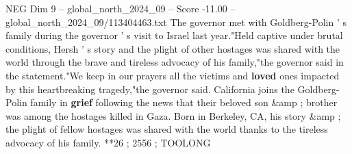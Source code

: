 \begin{textsample}{NEG Dim 9 – global\_north\_2024\_09 – Score -11.00 – global\_north\_2024\_09/113404463.txt}
The governor met with Goldberg-Polin ' s family during the governor ' s visit to Israel last year."Held captive under brutal conditions, Hersh ' s story and the plight of other hostages was shared with the world through the brave and tireless advocacy of his family,"the governor said in the statement."We keep in our prayers all the victims and \textbf{loved} ones impacted by this heartbreaking tragedy,"the governor said.
California joins the Goldberg-Polin family in \textbf{grief} following the news that their beloved son \&amp ; brother was among the hostages killed in Gaza.
Born in Berkeley, CA, his story \&amp ; the plight of fellow hostages was shared with the world thanks to the tireless advocacy of his family. **26 ; 2556 ; TOOLONG

\end{textsample}
